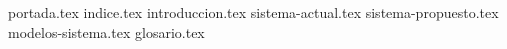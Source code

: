 \documentclass[12pt]{article}
\begin{document}
{portada.tex}
{indice.tex}
{introduccion.tex}
{sistema-actual.tex}
{sistema-propuesto.tex}
{modelos-sistema.tex}
{glosario.tex}
\end{document}
